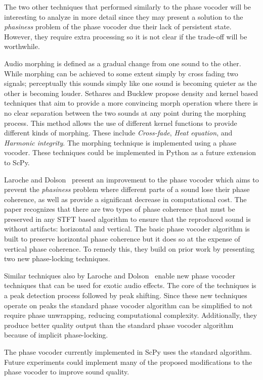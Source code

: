 \documentclass{article}
\begin{document}
The two other techniques that performed similarly to the phase vocoder will be interesting to
analyze in more detail since they may present a solution to the \textit{phasiness} problem of the
phase vocoder due their lack of persistent state. However, they require extra processing so it is
not clear if the trade-off will be worthwhile.

Audio morphing is defined as a gradual change from one sound to the other. While morphing can be
achieved to some extent simply by cross fading two signals; perceptually this sounds simply like
one sound is becoming quieter as the other is becoming louder. Sethares and Bucklew
\cite{sethares2012kernel} propose density and kernel based techniques that aim to provide a more
convincing morph operation where there is no clear separation between the two sounds at any point
during the morphing process. This method allows the use of different kernel functions to provide
different kinds of morphing. These include \textit{Cross-fade}, \textit{Heat equation}, and
\textit{Harmonic integrity}. The morphing technique is implemented using a phase vocoder. These
techniques could be implemented in Python as a future extension to ScPy.

Laroche and Dolson~\cite{laroche1999improved} present an improvement to the phase vocoder which
aims to prevent the \textit{phasiness} problem where different parts of a sound lose their phase
coherence, as well as provide a significant decrease in computational cost. The paper recognizes
that there are two types of phase coherence that must be preserved in any STFT based algorithm to
ensure that the reproduced sound is without artifacts: horizontal and vertical. The basic phase
vocoder algorithm is built to preserve horizontal phase coherence but it does so at the expense
of vertical phase coherence. To remedy this, they build on prior work by presenting two new
phase-locking techniques.

Similar techniques also by Laroche and Dolson~\cite{laroche1999new} enable new phase vocoder
techniques that can be used for exotic audio effects. The core of the techniques is a peak
detection process followed by peak shifting. Since these new techniques operate on peaks the
standard phase vocoder algorithm can be simplified to not require phase unwrapping, reducing
computational complexity. Additionally, they produce better quality output than the standard phase
vocoder algorithm because of implicit phase-locking.

The phase vocoder currently implemented in ScPy uses the standard algorithm. Future experiments
could implement many of the proposed modifications to the phase vocoder to improve sound quality.
\end{document}

